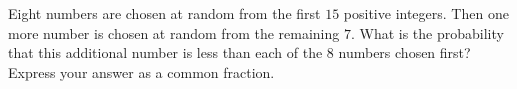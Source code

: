 Eight numbers are chosen at random from the first $15$ positive integers. Then one more number is chosen at random from the remaining $7$. What is the probability that this additional number is less than each of the $8$ numbers chosen first? Express your answer as a common fraction.
